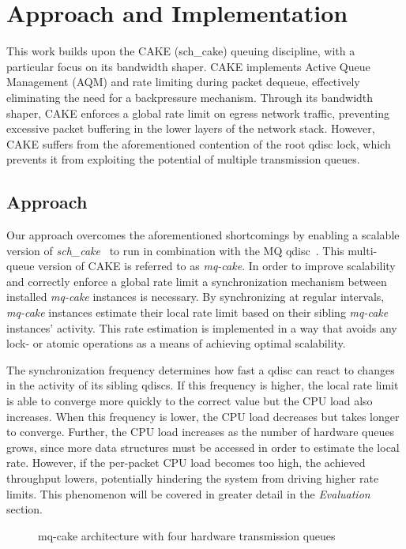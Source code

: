 \section{Approach and Implementation}
This work builds upon the CAKE (sch\_cake) queuing discipline, with a particular focus on its bandwidth shaper. CAKE implements Active Queue Management (AQM) and rate limiting during packet dequeue, effectively eliminating the need for a backpressure mechanism. Through its bandwidth shaper, CAKE enforces a global rate limit on egress network traffic, preventing excessive packet buffering in the lower layers of the network stack. However, CAKE suffers from the aforementioned contention of the root qdisc lock, which prevents it from exploiting the potential of multiple transmission queues.

\subsection{Approach}
Our approach overcomes the aforementioned shortcomings by enabling a scalable version of \textit{sch\_cake}~\cite{cake} to run in combination with the MQ qdisc~\cite{mq}.
%
This multi-queue version of CAKE is referred to as \textit{mq-cake}.
In order to improve scalability and correctly enforce a global rate limit a synchronization mechanism between installed \textit{mq-cake} instances is necessary.
%
By synchronizing at regular intervals, \textit{mq-cake} instances estimate their local rate limit based on their sibling \textit{mq-cake} instances' activity.  
%
This rate estimation is implemented in a way that avoids any lock- or atomic operations as a means of achieving optimal scalability.
%

The synchronization frequency determines how fast a qdisc can react to changes in the activity of its sibling qdiscs.
If this frequency is higher, the local rate limit is able to converge more quickly to the correct value but the CPU load also increases.
When this frequency is lower, the CPU load decreases but takes longer to converge.
%
Further, the CPU load increases as the number of hardware queues grows, since more data structures must be accessed in order to estimate the local rate.
%
However, if the per-packet CPU load becomes too high, the achieved throughput lowers, potentially hindering the system from driving higher rate limits.
This phenomenon will be covered in greater detail in the \textit{Evaluation} section.

\begin{figure}[h]
    \centering
    
    \caption{mq-cake architecture with four hardware transmission queues}\label{fig:mq_cake_architecture}
\end{figure}

